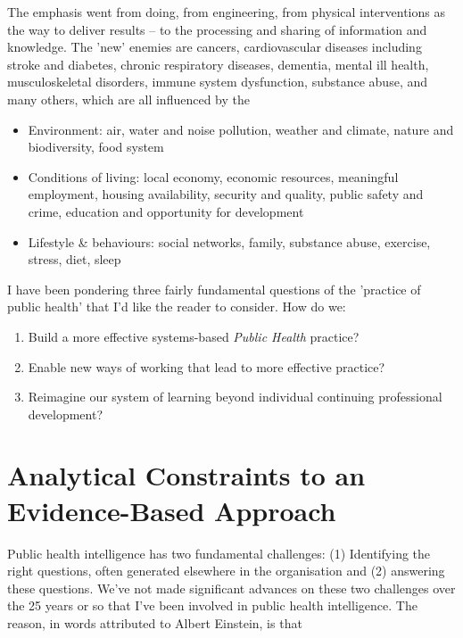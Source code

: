 The emphasis went from doing, from engineering, from physical interventions as the way to deliver results -- to the processing and sharing of information and knowledge. The 'new' enemies are cancers, cardiovascular diseases including stroke and diabetes, chronic respiratory diseases, dementia, mental ill health, musculoskeletal disorders, immune system dysfunction, substance abuse, and many others, which are all influenced by the
\begin{itemize}
	\item Environment: air, water and noise pollution, weather and climate, nature and biodiversity, food system
	\item Conditions of living: local economy, economic resources, meaningful employment, housing availability, security and quality, public safety and crime, education and opportunity for development
	\item Lifestyle \& behaviours: social networks, family, substance abuse, exercise, stress, diet, sleep
\end{itemize}

I have been pondering three fairly fundamental questions of the 'practice of public health' that I'd like the reader to consider. How do we:
\begin{enumerate}
	\item Build a more effective systems-based \emph{Public Health} practice?
	\item Enable new ways of working that lead to more effective practice?
	\item Reimagine our system of learning beyond individual continuing professional development?
\end{enumerate}




\chapter{Analytical Constraints to an Evidence-Based Approach}


Public health intelligence has two fundamental challenges: (1) Identifying the right questions, often generated elsewhere in the organisation and (2) answering these questions. We've not made significant advances on these two challenges over the 25 years or so that I've been involved in public health intelligence. The reason, in words attributed to Albert Einstein, is that

